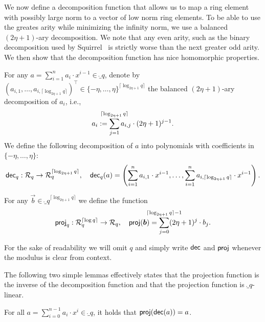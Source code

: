 We now define a decomposition function that allows us to map a ring element with possibly large norm to a vector of low norm ring elements.
To be able to use the greates arity while minimizing the infinity norm, we use a balanced $(2\eta+1)$-ary decomposition.
We note that any even arity, such as the binary decomposition used by Squirrel~\cite{CCS:FleSimZha22} is strictly worse than the next greater odd arity.
We then show that the decomposition function has nice homomorphic properties.
\begin{definition}
    For any $a = \sum_{i=1}^{n} a_i\cdot x^{i-1}  \in \ring_q$,
    denote by $(a_{i,1},\dots,a_{i,\lceil \log_{2\eta+1} q \rceil})^\intercal\in \{-\eta,\dots,\eta\}^{\lceil\log_{2\eta+1} q\rceil}$ the balanced $(2\eta+1)$-ary decomposition of $a_i$, i.e.,
    \[a_{i} := \smashoperator{\sum_{j=1}^{\lceil\log_{2\eta+1} q\rceil}} a_{i,j}\cdot (2\eta+1)^{j-1}.\]
    We define the following decomposition of $a$ into polynomials with coefficients in $\{-\eta,\dots,\eta\}$:
    \begin{equation*}
        \mathsf{dec}_q: \mathcal{R}_q \to \mathcal{R}_q^{\lceil\log_{2\eta+1} q\rceil},\quad
        \mathsf{dec}_q(a) = \left(\sum_{i=1}^{n} a_{i,1}\cdot x^{i-1}, \dots, \sum_{i=1}^{n} a_{i,\lceil\log_{2\eta+1} q\rceil}\cdot x^{i-1} \right).
    \end{equation*}
\end{definition}

\begin{definition}\label{def:proj}
  For any $\vec{b} \in \ring_q^{\lceil\log_{2\eta+1} q\rceil}$ we define the function 
  \[
    \proj_q : \ring_q^{\lceil\log q\rceil} \to \ring_q,\quad \proj(\vec{b}) = \smashoperator{\sum_{j=0}^{\lceil\log_{2\eta+1} q\rceil -1}} (2\eta+1)^j\cdot b_j.
  \]
\end{definition}

For the sake of readability we will omit $q$ and simply write $\mathsf{dec}$ and $\mathsf{proj}$ whenever the modulus is clear from context.

The following two simple lemmas effectively states that the projection function is the inverse of the decomposition function and that the projection function is $\ring_q$-linear.
\begin{lemma}\label{lem:projinvofbin}
  For all $a = \sum_{i=0}^{n-1} a_i\cdot x^i \in\ring_q$, it holds that $\mathsf{proj}(\mathsf{dec}(a))=a$.
\end{lemma}

